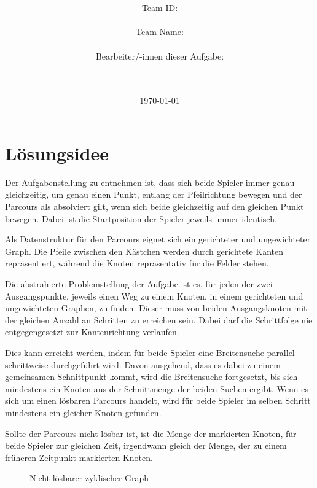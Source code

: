\documentclass[a4paper,10pt,ngerman]{scrartcl}
\title{\textbf{\Huge\Aufgabe}}
\author{\LARGE Team-ID: \LARGE \TeamId \\\\
\LARGE Team-Name: \LARGE \TeamName \\\\
\LARGE Bearbeiter/-innen dieser Aufgabe: \\
\LARGE \Namen\\\\}
\date{\LARGE\today}
\begin{document}
    \maketitle
    \tableofcontents

    \vspace{0.5cm}

    \section{Lösungsidee}\label{sec:losungsidee}
    Der Aufgabenstellung zu entnehmen ist,
    dass sich beide Spieler immer genau gleichzeitig,
    um genau einen Punkt,
    entlang der Pfeilrichtung bewegen und der Parcours als absolviert gilt,
    wenn sich beide gleichzeitig auf den gleichen Punkt bewegen.
    Dabei ist die Startposition der Spieler jeweils immer identisch.
    
    Als Datenstruktur für den Parcours eignet sich ein gerichteter und ungewichteter Graph.
    Die Pfeile zwischen den Kästchen werden durch gerichtete Kanten repräsentiert,
    während die Knoten repräsentativ für die Felder stehen.
    
    Die abstrahierte Problemstellung der Aufgabe ist es,
    für jeden der zwei Ausgangspunkte,
    jeweils einen Weg zu einem Knoten, 
    in einem gerichteten und ungewichteten Graphen, 
    zu finden.
    Dieser muss von beiden Ausgangsknoten mit der gleichen Anzahl an Schritten zu erreichen sein.
    Dabei darf die Schrittfolge nie entgegengesetzt zur Kantenrichtung verlaufen.
    
    Dies kann erreicht werden,
    indem für beide Spieler eine Breitensuche parallel schrittweise durchgeführt wird.
    Davon ausgehend, dass es dabei zu einem gemeinsamen Schnittpunkt kommt,
    wird die Breitensuche fortgesetzt, 
    bis sich mindestens ein Knoten aus der Schnittmenge der beiden Suchen ergibt.
    Wenn es sich um einen lösbaren Parcours handelt,
    wird für beide Spieler im selben Schritt mindestens ein gleicher Knoten gefunden.
    
    Sollte der Parcours nicht lösbar ist, 
    ist die Menge der markierten Knoten,
    für beide Spieler zur gleichen Zeit,
    irgendwann gleich der Menge,
    der zu einem früheren Zeitpunkt markierten Knoten. 
    
    \begin{figure}
    \centering
    \InfinityLoop{}
    \caption{Nicht lösbarer zyklischer Graph}
    \label{fig:Figure1}
    \end{figure}
    
\end{document}
